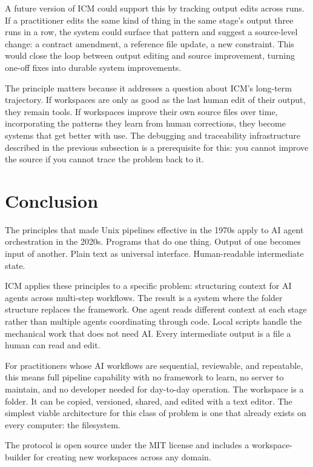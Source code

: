 \documentclass[acmlarge,nonacm,screen]{acmart}
\begin{document}
A future version of ICM could support this by tracking output edits across runs. If a practitioner edits the same kind of thing in the same stage's output three runs in a row, the system could surface that pattern and suggest a source-level change: a contract amendment, a reference file update, a new constraint. This would close the loop between output editing and source improvement, turning one-off fixes into durable system improvements.

The principle matters because it addresses a question about ICM's long-term trajectory. If workspaces are only as good as the last human edit of their output, they remain tools. If workspaces improve their own source files over time, incorporating the patterns they learn from human corrections, they become systems that get better with use. The debugging and traceability infrastructure described in the previous subsection is a prerequisite for this: you cannot improve the source if you cannot trace the problem back to it.

\section{Conclusion}

The principles that made Unix pipelines effective in the 1970s apply to AI agent orchestration in the 2020s. Programs that do one thing. Output of one becomes input of another. Plain text as universal interface. Human-readable intermediate state.

ICM applies these principles to a specific problem: structuring context for AI agents across multi-step workflows. The result is a system where the folder structure replaces the framework. One agent reads different context at each stage rather than multiple agents coordinating through code. Local scripts handle the mechanical work that does not need AI. Every intermediate output is a file a human can read and edit.

For practitioners whose AI workflows are sequential, reviewable, and repeatable, this means full pipeline capability with no framework to learn, no server to maintain, and no developer needed for day-to-day operation. The workspace is a folder. It can be copied, versioned, shared, and edited with a text editor. The simplest viable architecture for this class of problem is one that already exists on every computer: the filesystem.

The protocol is open source under the MIT license and includes a workspace-builder for creating new workspaces across any domain.
\end{document}
